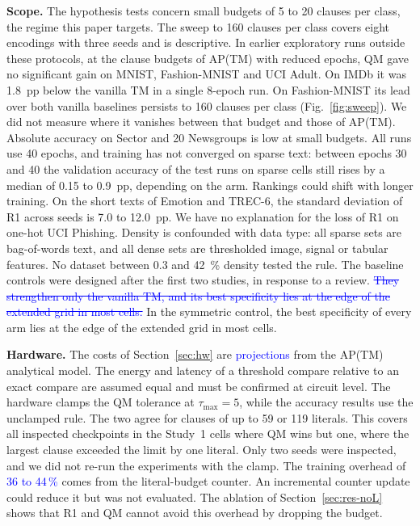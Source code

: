 \documentclass[preprint,12pt,times]{elsarticle}
\newcommand{\proj}[1]{\textcolor{blue}{#1}}
\newcommand{\add}[1]{{\color{blue}#1}}
\newcommand{\del}[1]{\textcolor{blue}{\sout{#1}}}
\begin{document}
\textbf{Scope.} The hypothesis tests concern small budgets of 5 to 20 clauses per class, the regime this paper targets. The sweep to 160 clauses per class covers eight encodings with three seeds and is descriptive.
In earlier exploratory runs outside these protocols, at the clause budgets of AP(TM) with reduced epochs, QM gave no significant gain on MNIST, Fashion-MNIST and UCI Adult. On IMDb it was 1.8~pp below the vanilla TM in a single 8-epoch run. On Fashion-MNIST its lead over both vanilla baselines persists to 160 clauses per class (Fig.~\ref{fig:sweep}). We did not measure where it vanishes between that budget and those of AP(TM).
Absolute accuracy on Sector and 20 Newsgroups is low at small budgets.
All runs use 40 epochs, and training has not converged on sparse text: between epochs 30 and 40 the validation accuracy of the test runs on sparse cells still rises by a median of 0.15 to 0.9~pp, depending on the arm. Rankings could shift with longer training.
On the short texts of Emotion and TREC-6, the standard deviation of R1 across seeds is 7.0 to 12.0~pp. We have no explanation for the loss of R1 on one-hot UCI Phishing.
Density is confounded with data type: all sparse sets are bag-of-words text, and all dense sets are thresholded image, signal or tabular features. No dataset between 0.3 and \SI{42}{\percent} density tested the rule.
The baseline controls were designed after the first two studies, in response to a review. \del{They strengthen only the vanilla TM, and its best specificity lies at the edge of the extended grid in most cells.}
\add{In the symmetric control, the best specificity of every arm lies at the edge of the extended grid in most cells.}

\textbf{Hardware.} The costs of Section~\ref{sec:hw} are \proj{projections} from the AP(TM) analytical model.
The energy and latency of a threshold compare relative to an exact compare are assumed equal and must be confirmed at circuit level.
The hardware clamps the QM tolerance at $\tau_{\max} = 5$, while the accuracy results use the unclamped rule.
The two agree for clauses of up to 59 or 119 literals. This covers all inspected checkpoints in the Study~1 cells where QM wins but one, where the largest clause exceeded the limit by one literal. Only two seeds were inspected, and we did not re-run the experiments with the clamp.
The training overhead of \proj{36 to 44\,\%} comes from the literal-budget counter.
An incremental counter update could reduce it but was not evaluated.
\add{The ablation of Section~\ref{sec:res-noL} shows that R1 and QM cannot avoid this overhead by dropping the budget.}
\end{document}
